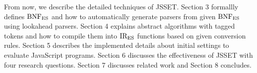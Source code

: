 From now, we describe the detailed techniques of JSSET.
Section 3 formallly defines \( \text{BNF}_{\text{ES}} \) and how to automatically
generate parsers from given \( \text{BNF}_{\text{ES}} \) using lookahead parsers.
Section 4 explains abstract algorithms with tagged tokens
and how to compile them into \( \text{IR}_\text{ES} \) functions based on
given conversion rules. Section 5 describes the implemented details
about initial settings to evaluate JavaScript programs. Section 6
discusses the effectiveness of JSSET with four research questions.
Section 7 discusses related work and Section 8 concludes.
